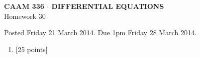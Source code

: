 \documentclass[10pt]{article}
\begin{document}
\vspace*{-5em}
\begin{center}
\large \textsf{\textbf{CAAM 336 $\cdot$ DIFFERENTIAL EQUATIONS}\\[0.5em]
Homework 30 }
\end{center}

Posted Friday 21 March 2014.  Due 1pm Friday 28 March 2014.

\begin{enumerate}\addtocounter{enumi}{29}
\item {[25 points]}  
\end{enumerate}
\end{document}
